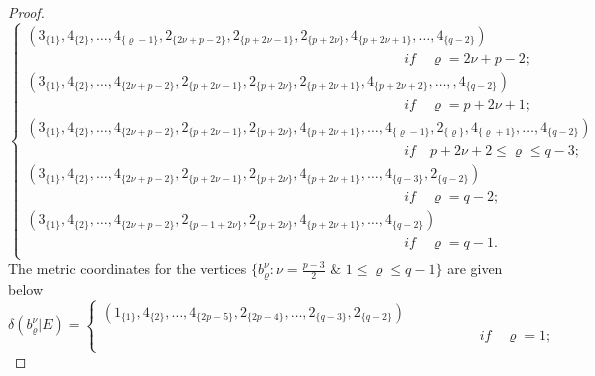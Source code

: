\documentclass[]{interact}
\theoremstyle{plain}%
\theoremstyle{definition}
\theoremstyle{remark}
\begin{document}
\begin{proof}
\begin{equation*}
\begin{cases}
                     (3_{\{1\}},4_{\{2\}}, \ldots,4_{\{\varrho-1 \}},2_{\{ 2\nu+p-2 \}},2_{\{p+2\nu-1\}},2_{\{p+2\nu\}},4_{\{p+2\nu+1\}},\ldots,4_{\{q-2\}})\\
\qquad \qquad \qquad \qquad \qquad \qquad \qquad \qquad \qquad  \qquad \qquad\qquad\qquad\quad\textit{if}\quad \varrho = 2\nu+p-2 ;\\
                     (3_{\{1\}},4_{\{2\}}, \ldots,4_{\{2\nu+p-2\}},2_{\{p+2\nu-1\}},2_{\{p+2\nu\}},2_{\{p+2\nu+1\}}, 4_{\{p+2\nu+2\}}, \ldots,,4_{\{q-2\}})\\
\qquad \qquad \qquad \qquad \qquad \qquad \qquad \qquad \qquad  \qquad \qquad\qquad\qquad\quad\textit{if}\quad\varrho= p+2\nu+1 ;\\
                    (3_{\{1\}},4_{\{2\}}, \ldots,4_{\{2\nu+p-2\}},2_{\{p+2\nu-1\}},2_{\{p+2\nu\}},4_{\{p+2\nu+1\}},\ldots,4_{\{\varrho-1 \}},2_{\{ \varrho \}},4_{\{\varrho +1\}},\ldots,4_{\{q-2\}})
\\
\qquad \qquad \qquad \qquad \qquad \qquad \qquad \qquad \qquad  \qquad \qquad\qquad\qquad\quad \textit{if} \quad p+2\nu+2 \leq  \varrho  \leq q-3  ;\\
                     (3_{\{1\}},4_{\{2\}}, \ldots,4_{\{2\nu+p-2\}},2_{\{p+2\nu-1\}},2_{\{p+2\nu\}},4_{\{p+2\nu+1\}},\ldots, 4_{\{q-3\}},2_{\{q-2\}})\\
\qquad \qquad \qquad \qquad \qquad \qquad \qquad \qquad \qquad  \qquad \qquad\qquad\qquad\quad\textit{if}\quad   \varrho = q-2  ;\\
                    (3_{\{1\}},4_{\{2\}}, \ldots,4_{\{2\nu+p-2\}},2_{\{p-1+2\nu\}},2_{\{p+2\nu\}},4_{\{p+2\nu+1\}},\ldots,4_{\{q-2\}}) \\
\qquad \qquad \qquad \qquad \qquad \qquad \qquad \qquad \qquad  \qquad \qquad\qquad\qquad\quad \textit{if}\quad\varrho= q-1.\\
                      \end{cases}
                    \end{equation*}
                    \noindent The metric coordinates for the vertices 
                     $\{b^\nu_\varrho: \nu =\frac{p-3}{2} $ $\&$  $1\leq \varrho\leq q-1 \}$ are given below
                        \begin{equation*}
                        \delta(b^{\nu}_{\varrho}|E)=
                   \begin{cases}
                   (1_{\{1\}},4_{\{2\}},\ldots,4_{\{2p-5 \}},2_{\{2p-4 \}}, \ldots,2_{\{q-3\}},2_{\{q-2\}})\\
\qquad \qquad \qquad \qquad \qquad \qquad \qquad \qquad \qquad  \qquad \qquad\qquad\qquad\quad\textit{if}\quad\varrho= 1;\\

\end{cases}
\end{equation*}
\end{proof}
\end{document}
